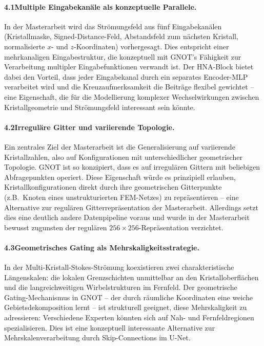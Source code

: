 \documentclass[a4paper,12pt]{article}
\begin{document}
\paragraph{4.1\quad Multiple Eingabekanäle als konzeptuelle Parallele.}
In der Masterarbeit wird das Strömungsfeld aus fünf Eingabekanälen (Kristallmaske,
Signed-Distance-Feld, Abstandsfeld zum nächsten Kristall, normalisierte $x$- und $z$-Koordinaten)
vorhergesagt. Dies entspricht einer mehrkanaligen Eingabestruktur, die konzeptuell
mit GNOT's Fähigkeit zur Verarbeitung multipler Eingabefunktionen verwandt ist.
Der HNA-Block bietet dabei den Vorteil, dass jeder Eingabekanal durch ein separates
Encoder-MLP verarbeitet wird und die Kreuzaufmerksamkeit die Beiträge flexibel
gewichtet -- eine Eigenschaft, die für die Modellierung komplexer Wechselwirkungen
zwischen Kristallgeometrie und Strömungsfeld interessant sein könnte.

\paragraph{4.2\quad Irreguläre Gitter und variierende Topologie.}
Ein zentrales Ziel der Masterarbeit ist die Generalisierung auf variierende Kristallzahlen,
also auf Konfigurationen mit unterschiedlicher geometrischer Topologie. GNOT ist so
konzipiert, dass es auf irregulären Gittern mit beliebigen Abfragepunkten operiert.
Diese Eigenschaft würde es prinzipiell erlauben, Kristallkonfigurationen direkt durch
ihre geometrischen Gitterpunkte (z.B.\ Knoten eines unstrukturierten FEM-Netzes) zu
repräsentieren -- eine Alternative zur regulären Gitterrepräsentation der Masterarbeit.
Allerdings setzt dies eine deutlich andere Datenpipeline voraus und wurde in der
Masterarbeit bewusst zugunsten der regulären $256 \times 256$-Repräsentation verzichtet.

\paragraph{4.3\quad Geometrisches Gating als Mehrskaligkeitsstrategie.}
In der Multi-Kristall-Stokes-Strömung koexistieren zwei charakteristische Längenskalen:
die lokalen Grenzschichten unmittelbar an den Kristalloberflächen und die
langreichweitigen Wirbelstrukturen im Fernfeld. Der geometrische Gating-Mechanismus
in GNOT -- der durch räumliche Koordinaten eine weiche Gebietsdekomposition lernt --
ist strukturell geeignet, diese Mehrskaligkeit zu adressieren: Verschiedene Experten
könnten sich auf Nah- und Fernfeldregionen spezialisieren. Dies ist eine konzeptuell
interessante Alternative zur Mehrskalenverarbeitung durch Skip-Connections im U-Net.
\end{document}
